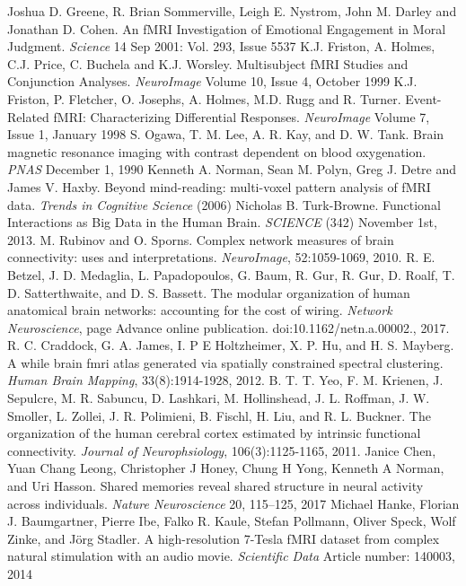 \documentclass[11pt]{article}
\begin{document}
\begin{thebibliography}{1}
Joshua D. Greene, R. Brian Sommerville, Leigh E. Nystrom, John M. Darley and Jonathan D. Cohen. An fMRI Investigation of Emotional Engagement in Moral Judgment. \textit{Science}  14 Sep 2001: Vol. 293, Issue 5537
 K.J. Friston, A. Holmes, C.J. Price, C. Buchela and K.J. Worsley. Multisubject fMRI Studies and Conjunction Analyses. \textit{NeuroImage} Volume 10, Issue 4, October 1999
 K.J. Friston, P. Fletcher, O. Josephs, A. Holmes, M.D. Rugg and R. Turner. Event-Related fMRI: Characterizing Differential Responses. \textit{NeuroImage} Volume 7, Issue 1, January 1998
 S. Ogawa, T. M. Lee, A. R. Kay, and D. W. Tank. Brain magnetic resonance imaging with contrast dependent on blood oxygenation. \textit{PNAS} December 1, 1990
 Kenneth A. Norman, Sean M. Polyn, Greg J. Detre and James V. Haxby. Beyond mind-reading: multi-voxel pattern analysis of fMRI data. \textit{Trends in Cognitive Science} (2006)
 Nicholas B. Turk-Browne. Functional Interactions as Big Data in the Human Brain. \textit{SCIENCE} (342) November 1st, 2013.
 M. Rubinov and O. Sporns. Complex network measures of brain connectivity: uses and interpretations. \textit{NeuroImage}, 52:1059-1069, 2010.
 R. E. Betzel, J. D. Medaglia, L. Papadopoulos, G. Baum, R. Gur, R. Gur, D. Roalf, T. D. Satterthwaite, and D. S. Bassett. The modular organization of human anatomical brain networks: accounting for the cost of wiring. \textit{Network Neuroscience}, page Advance online publication. doi:10.1162/netn.a.00002., 2017.
 R. C. Craddock, G. A. James, I. P E Holtzheimer, X. P. Hu, and H. S. Mayberg. A while brain fmri atlas generated via spatially constrained spectral clustering. \textit{Human Brain Mapping}, 33(8):1914-1928, 2012.
 B. T. T. Yeo, F. M. Krienen, J. Sepulcre, M. R. Sabuncu, D. Lashkari, M. Hollinshead, J. L. Roffman, J. W. Smoller, L. Zollei, J. R. Polimieni, B. Fischl, H. Liu, and R. L. Buckner. The organization of the human cerebral cortex estimated by intrinsic functional connectivity. \textit{Journal of Neurophsiology}, 106(3):1125-1165, 2011.
 Janice Chen,	Yuan Chang Leong,	Christopher J Honey, Chung H Yong,	Kenneth A Norman, and Uri Hasson. Shared memories reveal shared structure in neural activity across individuals. \textit{Nature Neuroscience} 20, 115–125, 2017
 Michael Hanke, Florian J. Baumgartner, Pierre Ibe, Falko R. Kaule, Stefan Pollmann, Oliver Speck, Wolf Zinke, and Jörg Stadler. A high-resolution 7-Tesla fMRI dataset from complex natural stimulation with an audio movie. \textit{Scientific Data} Article number: 140003, 2014
\end{thebibliography}
\end{document}

